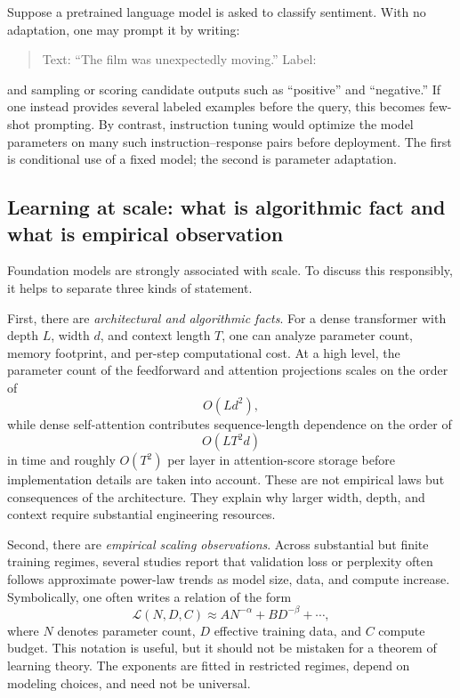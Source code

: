 \begin{example}
Suppose a pretrained language model is asked to classify sentiment.
With no adaptation, one may prompt it by writing:
\begin{quote}
Text: ``The film was unexpectedly moving.''\newline
Label:
\end{quote}
and sampling or scoring candidate outputs such as ``positive'' and ``negative.''
If one instead provides several labeled examples before the query, this becomes few-shot prompting.
By contrast, instruction tuning would optimize the model parameters on many such instruction--response pairs before deployment.
The first is conditional use of a fixed model; the second is parameter adaptation.
\end{example}

\subsection*{Learning at scale: what is algorithmic fact and what is empirical observation}

Foundation models are strongly associated with scale.
To discuss this responsibly, it helps to separate three kinds of statement.

First, there are \emph{architectural and algorithmic facts}.
For a dense transformer with depth $L$, width $d$, and context length $T$, one can analyze parameter count, memory footprint, and per-step computational cost.
At a high level, the parameter count of the feedforward and attention projections scales on the order of
\[
O(Ld^2),
\]
while dense self-attention contributes sequence-length dependence on the order of
\[
O(LT^2d)
\]
in time and roughly $O(T^2)$ per layer in attention-score storage before implementation details are taken into account.
These are not empirical laws but consequences of the architecture.
They explain why larger width, depth, and context require substantial engineering resources.

Second, there are \emph{empirical scaling observations}.
Across substantial but finite training regimes, several studies report that validation loss or perplexity often follows approximate power-law trends as model size, data, and compute increase.
Symbolically, one often writes a relation of the form
\[
\mathcal{L}(N,D,C)
\approx
A N^{-\alpha} + B D^{-\beta} + \cdots,
\]
where $N$ denotes parameter count, $D$ effective training data, and $C$ compute budget.
This notation is useful, but it should not be mistaken for a theorem of learning theory.
The exponents are fitted in restricted regimes, depend on modeling choices, and need not be universal.

